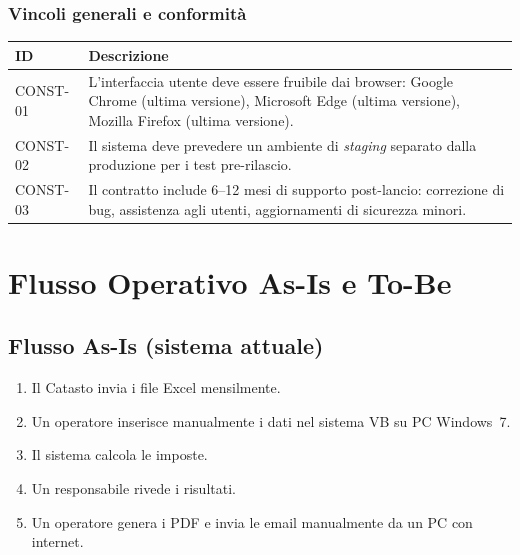 \documentclass[12pt, a4paper]{article}
\begin{document}
\subsubsection{Vincoli generali e conformità}

\begin{longtable}{@{}p{2.5cm}p{9.5cm}@{}}
  \toprule
  \textbf{ID} & \textbf{Descrizione} \\
  \midrule
  \endhead

  CONST-01 &
  L'interfaccia utente deve essere fruibile dai browser: Google Chrome (ultima versione),
  Microsoft Edge (ultima versione), Mozilla Firefox (ultima versione). \\[6pt]

  CONST-02 &
  Il sistema deve prevedere un ambiente di \textit{staging} separato dalla produzione per
  i test pre-rilascio. \\[6pt]

  CONST-03 &
  Il contratto include 6--12 mesi di supporto post-lancio: correzione di bug, assistenza
  agli utenti, aggiornamenti di sicurezza minori. \\

  \bottomrule
\end{longtable}

\appendix
\section{Flusso Operativo As-Is e To-Be}

\subsection{Flusso As-Is (sistema attuale)}

\begin{enumerate}
  \item Il Catasto invia i file Excel mensilmente.
  \item Un operatore inserisce manualmente i dati nel sistema VB su PC Windows~7.
  \item Il sistema calcola le imposte.
  \item Un responsabile rivede i risultati.
  \item Un operatore genera i PDF e invia le email manualmente da un PC con internet.
\end{enumerate}
\end{document}
